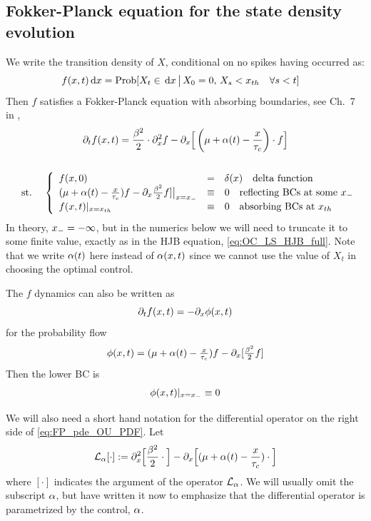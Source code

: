 \documentclass[12pt]{iopart}
\begin{document}
\subsection{Fokker-Planck equation for the state density evolution}
We write the transition density of $X$, conditional on no
spikes having occurred as:
\begin{align*}
f(x,t) \, \mathrm{d} x &= \operatorname{Prob}[X_t\in \, \mathrm{d} x \,\big|\, X_0 = 0,\, X_{s} < { x_{th} } \quad
\forall s < t]
\end{align*}
Then $f$ satisfies a Fokker-Planck equation with absorbing boundaries,
see Ch.\ 7 in \cite{Jacobs},
\begin{equation}
\begin{gathered}
{\partial}_t f(x,t) =
				\frac{{\beta}^2 }{2}\cdot {\partial}^2_x f -
				{\partial}_x \Big[ \left( {\mu } + {\alpha}(t)- \frac{x}{{ \tau_{c} }}\right)  \cdot f \Big]
\\
\\
\begin{array}{lll}
	&\textrm{st.\ }&
	\left\{ \begin{array}{lcl}
	 f(x,0) &=& \delta(x) \quad \textrm{delta function}
	\\
	({\mu } + {\alpha}(t)- \tfrac x {{ \tau_{c} }})f - {\partial}_x \tfrac {{\beta}^2}2 f] \big|_{x={ x_{-} }} &\equiv&
	0 \quad \textrm{reflecting BCs at some } { x_{-} }
	\\
	f(x,t) |_{x={ x_{th} }} &\equiv& 0 \quad \textrm{absorbing BCs at } { x_{th} }
\end{array} \right.
\end{array}
\label{eq:FP_pde_OU_PDF}
\end{gathered}
\end{equation}
In theory, ${ x_{-} } = -\infty$, but in the numerics below we will need to
truncate it to some finite value, exactly as in the HJB equation,
\cref{eq:OC_LS_HJB_full}.
Note that we write ${\alpha}(t)$ here instead of ${\alpha}(x,t)$ since we cannot use the
value of $X_t$ in choosing the optimal control.

The $f$ dynamics can also be written as
$$
{\partial}_t f(x,t) = - {\partial}_x \phi(x,t)
$$
for the probability flow
$$
\phi(x,t) = ({\mu } + {\alpha}(t) - \tfrac x {{ \tau_{c} }})f - {\partial}_x [\tfrac {{\beta}^2}2 f]
$$
Then the lower BC is
$$
\phi(x,t) |_{x={ x_{-} }} \equiv 0
$$

We will also need a short hand notation for the differential operator on the
right side of \cref{eq:FP_pde_OU_PDF}. Let
$$ { \mathcal{L} }_{\alpha}[\cdot] := {\partial}^2_x \Big[\frac{{\beta}^2 }{2} \cdot\Big] -
 {\partial}_x \Big[ ({\mu } + {\alpha}(t)- \frac{x}{{ \tau_{c} }}) \cdot \Big] $$where
 $[\cdot]$ indicates the argument of the operator ${ \mathcal{L} }_{\alpha}$. We will usually
 omit the subscript ${\alpha}$, but have written it now to emphasize that the
 differential operator is parametrized by the control, ${\alpha}$.
\end{document}

